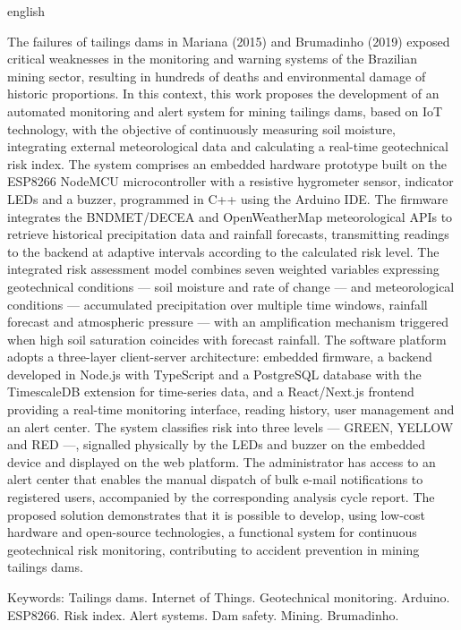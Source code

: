 \begin{resumo}[Abstract]
\begin{otherlanguage*}{english}
\begin{SingleSpace}
The failures of tailings dams in Mariana (2015) and Brumadinho (2019)
exposed critical weaknesses in the monitoring and warning systems of the
Brazilian mining sector, resulting in hundreds of deaths and
environmental damage of historic proportions. In this context, this
work proposes the development of an automated monitoring and alert
system for mining tailings dams, based on IoT technology, with the
objective of continuously measuring soil moisture, integrating external
meteorological data and calculating a real-time geotechnical risk index.
The system comprises an embedded hardware prototype built on the
ESP8266 NodeMCU microcontroller with a resistive hygrometer sensor,
indicator LEDs and a buzzer, programmed in C++ using the Arduino IDE.
The firmware integrates the BNDMET/DECEA and OpenWeatherMap
meteorological APIs to retrieve historical precipitation data and
rainfall forecasts, transmitting readings to the backend at adaptive
intervals according to the calculated risk level. The integrated risk
assessment model combines seven weighted variables expressing geotechnical
conditions --- soil moisture and rate of change --- and meteorological
conditions --- accumulated precipitation over multiple time windows,
rainfall forecast and atmospheric pressure --- with an amplification
mechanism triggered when high soil saturation coincides with forecast
rainfall. The software platform adopts a three-layer client-server
architecture: embedded firmware, a backend developed in Node.js with
TypeScript and a PostgreSQL database with the TimescaleDB extension for
time-series data, and a React/Next.js frontend providing a real-time
monitoring interface, reading history, user management and an alert
center. The system classifies risk into three levels --- GREEN, YELLOW
and RED ---, signalled physically by the LEDs and buzzer on the embedded
device and displayed on the web platform. The administrator has access to
an alert center that enables the manual dispatch of bulk e-mail
notifications to registered users, accompanied by the corresponding
analysis cycle report. The proposed solution demonstrates that it is
possible to develop, using low-cost hardware and open-source technologies,
a functional system for continuous geotechnical risk monitoring,
contributing to accident prevention in mining tailings dams.

\vspace{\onelineskip}
\noindent Keywords: Tailings dams. Internet of Things. Geotechnical monitoring. Arduino. ESP8266. Risk index. Alert systems. Dam safety. Mining. Brumadinho.

\end{SingleSpace}
\end{otherlanguage*}
\end{resumo}